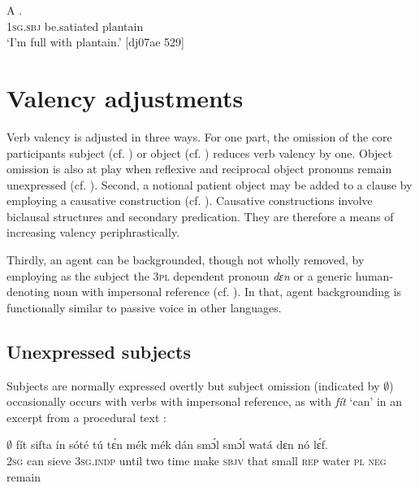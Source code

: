 \ea%
    \label{ex:key:1269}
    \gll A        .\\
\textsc{1sg.sbj}  be.satiated  plantain\\

\glt ‘I’m full with plantain.’ [dj07ae 529]
\z

\section{Valency adjustments}\label{sec:9.4}

Verb valency is adjusted in three ways. For one part, the omission of the core participants subject (cf. ) or object (cf. ) reduces verb valency by one. Object omission is also at play when reflexive and reciprocal object pronouns remain unexpressed (cf. ). Second, a notional patient object may be added to a clause by employing a causative construction (cf. ). Causative constructions involve biclausal structures and secondary predication. They are therefore a means of increasing valency periphrastically.


Thirdly, an agent can be backgrounded, though not wholly removed, by employing as the subject the \textsc{3pl} dependent pronoun \textit{dɛn} or a generic human-denoting noun with impersonal reference (cf. ). In that, agent backgrounding is functionally similar to passive voice in other languages. 


\subsection{Unexpressed subjects}\label{sec:9.4.1}

Subjects are normally expressed overtly but subject omission (indicated by ${\emptyset}$) occasionally occurs with verbs with impersonal reference, as with \textit{fít} ‘can’ in an excerpt from a procedural text : 


\ea%
    \label{ex:key:1270}
    \gll ${\emptyset}$  fít  sifta    ín    sóté    tú  tɛ́n    mék    mék
dán  smɔ́l  smɔ́l  watá  dɛn  nó  lɛ́f.\\
\textsc{2sg}  can  sieve  \textsc{3sg.indp}  until  two  time    make  \textsc{sbjv}
that  small  \textsc{rep}    water  \textsc{pl}  \textsc{neg}  remain\\

